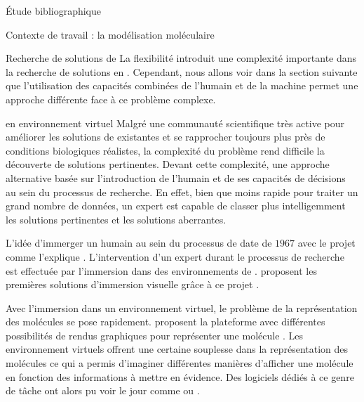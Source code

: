 \documentclass[myfrancais,ngerman,english,french]{mythesis}
\begin{document}
\begin{mychapter}{Étude bibliographique}
\begin{mysection}{Contexte de travail : la modélisation moléculaire}
\begin{mysubsection}{Recherche de solutions de }
				La flexibilité introduit une complexité importante dans la recherche de solutions en .
				Cependant, nous allons voir dans la section suivante que l'utilisation des capacités combinées de l'humain et de la machine permet une approche différente face à ce problème complexe.
			\end{mysubsection}
			\begin{mysubsection}{ en environnement virtuel}
				Malgré une communauté scientifique très active pour améliorer les solutions de  existantes et se rapprocher toujours plus près de conditions biologiques réalistes, la complexité du problème rend difficile la découverte de solutions pertinentes.
				Devant cette complexité, une approche alternative basée sur l'introduction de l'humain et de ses capacités de décisions au sein du processus de recherche.
				En effet, bien que moins rapide pour traiter un grand nombre de données, un expert est capable de classer plus intelligemment les solutions pertinentes et les solutions aberrantes.

				L'idée d'immerger un humain au sein du processus de  date de $1967$ avec le projet \myGROPE comme l'explique .
				L'intervention d'un expert durant le processus de recherche est effectuée par l'immersion dans des environnements de .
				 proposent les premières solutions d'immersion visuelle grâce à ce projet \myGROPE.

				Avec l'immersion dans un environnement virtuel, le problème de la représentation des molécules se pose rapidement.
				 proposent la plateforme \myVIEW avec différentes possibilités de rendus graphiques pour représenter une molécule .
				Les environnement virtuels offrent une certaine souplesse dans la représentation des molécules ce qui a permis d'imaginer différentes manières d'afficher une molécule en fonction des informations à mettre en évidence.
				Des logiciels dédiés à ce genre de tâche ont alors pu voir le jour comme   ou \myPyMOL {}.

				\begin{myfigure}
				\end{myfigure}


\end{mysubsection}
\end{mysection}
\end{mychapter}
\end{document}
